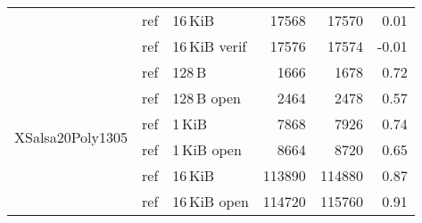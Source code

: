 \begin{table}
\begin{tabular}{lllrrr}
 & ref & 16\,KiB        & 17568
                        & 17570
                        & 0.01 \\

 & ref & 16\,KiB verif  & 17576
                        & 17574
                        & -0.01 \\

      \midrule
    \multirow{8}{*}{XSalsa20Poly1305}

 & ref & 128\,B         & 1666
                        & 1678
                        & 0.72 \\

 & ref & 128\,B open    & 2464
                        & 2478
                        & 0.57 \\

 & ref & 1\,KiB         & 7868
                        & 7926
                        & 0.74 \\

 & ref & 1\,KiB open    & 8664
                        & 8720
                        & 0.65 \\

 & ref & 16\,KiB        & 113890
                        & 114880
                        & 0.87 \\

 & ref & 16\,KiB open   & 114720
                        & 115760
                        & 0.91 \\
  \bottomrule
  \end{tabular}
\end{table}

